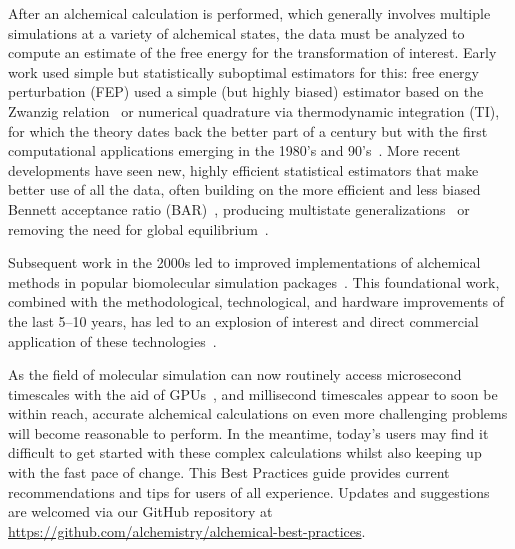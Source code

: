\documentclass[9pt,bestpractices,pubversion]{livecoms}
\begin{document}
After an alchemical calculation is performed, which generally involves multiple simulations at a variety of alchemical states, the data must be analyzed to compute an estimate of the free energy for the transformation of interest.
 Early work used simple but statistically suboptimal estimators for this: free energy perturbation (FEP) used a simple (but highly biased) estimator based on the Zwanzig relation~\cite{zwanzig1954hightemperature} or numerical quadrature via thermodynamic integration (TI), for which the theory dates back the better part of a century but with the first computational applications emerging in the 1980's and 90's~\cite{kirkwood1935statistical, jorgensen1985monte, kollman1993free, wong1986dynamics, merz1989free}. %
 More recent developments have seen new, highly efficient statistical estimators that make better use of all the data, often building on the more efficient and less biased Bennett acceptance ratio (BAR)~\cite{bennett1976efficient}, producing multistate generalizations~\cite{shirts2008statisticallya} or removing the need for global equilibrium~\cite{wu2016multiensemble, mey2014xtram, wu2014statistically}.

Subsequent work in the 2000s led to improved implementations of alchemical methods in popular biomolecular simulation packages~\cite{shirts2003extremely,shirts2005solvation,vanderspoel2005gromacs, mermelstein2018fast, wang2015accurate, hedges2019biosimspace, riniker2011calculation}. 
 This foundational work, combined with the methodological, technological, and hardware improvements of the last 5--10 years, has led to an explosion of interest and direct commercial application of these technologies~\cite{wang2015accurate, fratev2019improved, schindler2020largescale, cournia2017relative, sherborne2016collaborating, kuhn2020assessment}.


As the field of molecular simulation can now routinely access microsecond timescales with the aid of GPUs~\cite{salomon-ferrer2013routine}, and millisecond timescales appear to soon be within reach, accurate alchemical calculations on even more challenging problems will become reasonable to perform. 
In the meantime, today's users may find it difficult to get started with these complex calculations whilst also keeping up with the fast pace of change. 
This Best Practices guide provides current recommendations and tips for users of all experience. Updates and suggestions are welcomed via our GitHub repository at \url{https://github.com/alchemistry/alchemical-best-practices}.    
\end{document}
